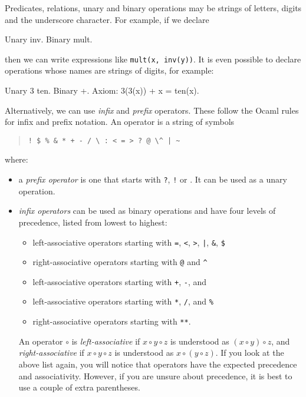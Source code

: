 \documentclass{article}
\begin{document}
Predicates, relations, unary and binary operations may be strings of
letters, digits and the underscore character. For example, if we
declare
%
\begin{source}
Unary inv.
Binary mult.
\end{source}
%
then we can write expressions like \texttt{mult(x, inv(y))}. It is
even possible to declare operations whose names are strings of digits,
for example:
%
\begin{source}
Unary 3 ten.
Binary +.
Axiom: 3(3(x)) + x = ten(x).
\end{source}
%
Alternatively, we can use \emph{infix} and \emph{prefix} operators.
These follow the Ocaml rules for infix and prefix notation. An
operator is a string of symbols
%
\begin{quote}
  \verb.! $ % & * + - / \ : < = > ? @ \^ | ~.
\end{quote}
where:
%
\begin{itemize}
\item a \emph{prefix operator} is one that starts with \texttt{?},
  \texttt{!} or \texttt{}. It can be used as a unary operation.
\item \emph{infix operators} can be used as binary operations and have
  four levels of precedence, listed from lowest to highest:
  \begin{itemize}
    \item left-associative operators starting with \texttt{=},
      \texttt{<}, \texttt{>}, \texttt{|}, \texttt{\&}, \texttt{\$}
    \item right-associative operators starting with \texttt{@} and \texttt{\^}
    \item left-associative operators starting with \texttt{+}, \texttt{-},
      and \texttt{}
    \item left-associative operators starting with \texttt{*}, \texttt{/}, and \texttt{\%} 
    \item right-associative operators starting with \texttt{**}.
  \end{itemize}
  An operator $\circ$ is \emph{left-associative} if $x \circ y \circ
  z$ is understood as $(x \circ y) \circ z$, and
  \emph{right-associative} if $x \circ y \circ z$ is understood as $x
  \circ (y \circ z)$. If you look at the above list again, you will
  notice that operators have the expected precedence and
  associativity. However, if you are unsure about precedence, it is
  best to use a couple of extra parentheses.
\end{itemize}
\end{document}
